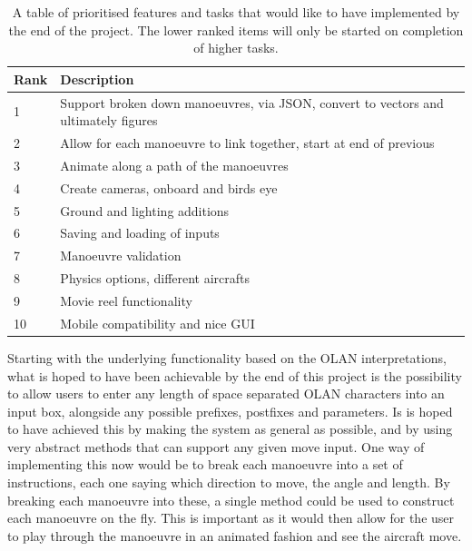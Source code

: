 \clearpage

\begin{table}[h!]
\caption{A table of prioritised features and tasks that would like to have implemented by the end of the project. The lower ranked items will only be started on completion of higher tasks.}
 \label{tbl:rank-table}
\begin{tabular}{|l|l|}
\hline
\textbf{Rank} & \textbf{Description}                                                                \\ \hline
1             & Support broken down manoeuvres, via JSON, convert to vectors and ultimately figures \\ \hline
2             & Allow for each manoeuvre to link together, start at end of previous                 \\ \hline
3             & Animate along a path of the manoeuvres                                              \\ \hline
4             & Create cameras, onboard and birds eye                                               \\ \hline
5             & Ground and lighting additions                                                       \\ \hline
6             & Saving and loading of inputs                                                        \\ \hline
7             & Manoeuvre validation                                                                \\ \hline
8             & Physics options, different aircrafts                                                \\ \hline
9             & Movie reel functionality                                                            \\ \hline
10            & Mobile compatibility and nice GUI                                                   \\ \hline
\end{tabular}
\end{table}

Starting with the underlying functionality based on the OLAN interpretations, what is hoped to have been achievable by the end of this project is the possibility to allow users to enter any length of space separated OLAN characters into an input box, alongside any possible prefixes, postfixes and parameters. Is is hoped to have achieved this by making the system as general as possible, and by using very abstract methods that can support any given move input. One way of implementing this now would be to break each manoeuvre into a set of instructions, each one saying which direction to move, the angle and length. By breaking each manoeuvre into these, a single method could be used to construct each manoeuvre on the fly. This is important as it would then allow for the user to play through the manoeuvre in an animated fashion and see the aircraft move.

